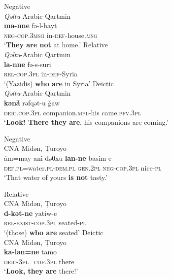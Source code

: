\documentclass[output=paper,colorlinks,citecolor=brown,draftmode]{langscibook}
\begin{document}
\ea\label{Arabic:ex:27}
\ea\label{Arabic:ex:27a}
Negative \\
\textit{Qəltu}-Arabic Qartmin \citep[137]{Jastrow1978MAqetlu1} \\
\gll \textbf{ma-nne} fə-l-bayt \\
\textsc{neg-cop.3msg} in-\textsc{def}-house\textsc{.msg} \\
\glt `\textbf{They are not} at home.'
\ex\label{Arabic:ex:27b}
Relative \\
\textit{Qəltu}-Arabic Qartmin \citep[138]{Jastrow1978MAqetlu1} \\
\gll \textbf{la-nne} fə-s-suri \\
\textsc{rel-cop.3pl} in-\textsc{def}-Syria \\
\glt `(Yazidis) \textbf{who are} in Syria'
\ex\label{Arabic:ex:27c}
Deictic \\
\textit{Qəltu}-Arabic Qartmin \citep[140]{Jastrow1978MAqetlu1} \\
\gll \textbf{kənā́} rəfqət-u ǧaw \\
\textsc{deic.cop.3pl} companion\textsc{.mpl-}his came\textsc{.pfv.3pl} \\
\glt `\textbf{Look! There they are}, his companions are coming.'
\z
\z

\ea\label{Arabic:ex:28}
\ea\label{Arabic:ex:28a}
Negative \\
CNA Midən, Ṭuroyo \citep[115:§206]{Ritter1967Turoyo} \\
\gll ám=may-ani dəθxu \textbf{lan-ne} basim-e \\
\textsc{def.pl=}water\textsc{.pl-dem.pl} \textsc{gen.2pl} \textsc{neg-cop.3pl} nice\textsc{-pl} \\
\glt `That water of yours \textbf{is not} tasty.'

\ex\label{Arabic:ex:28b}
Relative \\
CNA Midən, Ṭuroyo \citep[115:§24]{Ritter1967Turoyo} \\
\gll \textbf{d-kət-ne} yatiw-e \\
\textsc{rel-exist-cop.3pl} seated\textsc{-pl} \\
\glt `(those) \textbf{who are} seated' 
\ex\label{Arabic:ex:28c}
Deictic \\
CNA Midən, Ṭuroyo \citep[116:§48]{Ritter1967Turoyo} \\
\gll \textbf{ka-lən=ne} tamo \\
\textsc{deic-3pl=cop.3pl} there \\
\glt `\textbf{Look, they are} there!'
\z
\z
\end{document}
